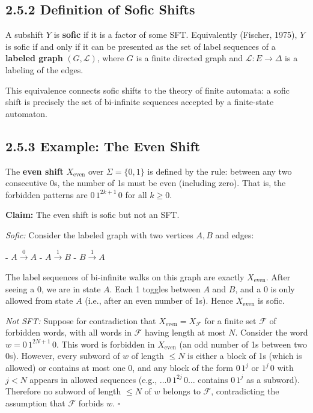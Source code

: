 \subsection{2.5.2 Definition of Sofic Shifts}

\begin{definition}
A subshift $Y$ is \textbf{sofic} if it is a factor of some SFT. Equivalently (Fischer, 1975), $Y$ is sofic if and only if it can be presented as the set of label sequences of a \textbf{labeled graph} $(G, \mathcal{L})$, where $G$ is a finite directed graph and $\mathcal{L} : E \to \Delta$ is a labeling of the edges.

This equivalence connects sofic shifts to the theory of finite automata: a sofic shift is precisely the set of bi-infinite sequences accepted by a finite-state automaton.
\end{definition}

\subsection{2.5.3 Example: The Even Shift}

\begin{example}
The \textbf{even shift} $X_{\text{even}}$ over $\Sigma = \{ 0, 1\} $ is defined by the rule: between any two consecutive 0s, the number of 1s must be even (including zero). That is, the forbidden patterns are $0 \, 1^{2k+1} \, 0$ for all $k \geq 0$.

\textbf{Claim:} The even shift is sofic but not an SFT.

\textit{Sofic:} Consider the labeled graph with two vertices $A, B$ and edges:

- $A \xrightarrow{0} A$
- $A \xrightarrow{1} B$
- $B \xrightarrow{1} A$

The label sequences of bi-infinite walks on this graph are exactly $X_{\text{even}}$. After seeing a 0, we are in state $A$. Each 1 toggles between $A$ and $B$, and a 0 is only allowed from state $A$ (i.e., after an even number of 1s). Hence $X_{\text{even}}$ is sofic.

\textit{Not SFT:} Suppose for contradiction that $X_{\text{even}} = X_{\mathcal{F}}$ for a finite set $\mathcal{F}$ of forbidden words, with all words in $\mathcal{F}$ having length at most $N$. Consider the word $w = 0\,1^{2N+1}\,0$. This word is forbidden in $X_{\text{even}}$ (an odd number of 1s between two 0s). However, every subword of $w$ of length $\leq N$ is either a block of 1s (which is allowed) or contains at most one 0, and any block of the form $0\,1^j$ or $1^j\,0$ with $j < N$ appears in allowed sequences (e.g., $\ldots 0\,1^{2j}\,0 \ldots$ contains $0\,1^j$ as a subword). Therefore no subword of length $\leq N$ of $w$ belongs to $\mathcal{F}$, contradicting the assumption that $\mathcal{F}$ forbids $w$. $\square$
\end{example}

